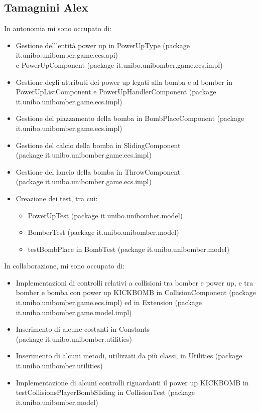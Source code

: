 \documentclass[a4paper,12pt]{report}
\begin{document}
\subsection*{Tamagnini Alex}
In autonomia mi sono occupato di:
\begin{itemize}
    \item Gestione dell’entità power up in PowerUpType (package it.unibo.unibomber.game.ecs.api) 
        \\e PowerUpComponent (package it.unibo.unibomber.game.ecs.impl)
    \item Gestione degli attributi dei power up legati alla bomba e al bomber in PowerUpListComponent e PowerUpHandlerComponent (package it.unibo.unibomber.game.ecs.impl)
    \item Gestione del piazzamento della bomba in BombPlaceComponent (package it.unibo.unibomber.game.ecs.impl)
    \item Gestione del calcio della bomba in SlidingComponent
          \\(package it.unibo.unibomber.game.ecs.impl)
    \item Gestione del lancio della bomba in ThrowComponent 
    \\(package it.unibo.unibomber.game.ecs.impl)
    \item Creazione dei test, tra cui:
          \begin{itemize}
              \item PowerUpTest (package it.unibo.unibomber.model)
              \item BomberTest (package it.unibo.unibomber.model)
              \item testBombPlace in BombTest (package it.unibo.unibomber.model)
          \end{itemize}
\end{itemize}
In collaborazione, mi sono occupato di:
\begin{itemize}
    \item Implementazioni di controlli relativi a collisioni tra bomber e power up, e tra bomber e bomba con power up KICKBOMB in CollisionComponent (package it.unibo.unibomber.game.ecs.impl) ed in Extension (package it.unibo.unibomber.game.model.impl)
    \item Inserimento di alcune costanti in Constants 
    \\(package it.unibo.unibomber.utilities)
    \item Inserimento di alcuni metodi, utilizzati da più classi, in Utilities (package it.unibo.unibomber.utilities)
    \item Implementazione di alcuni controlli riguardanti il power up KICKBOMB in testCollisionsPlayerBombSliding in CollisionTest (package it.unibo.unibomber.model)
\end{itemize}
\end{document}
